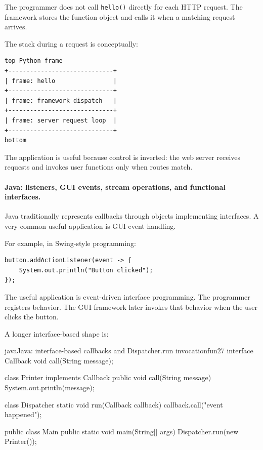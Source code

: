 \documentclass[a4paper,twoside]{report}
\begin{document}
The programmer does not call \texttt{hello()} directly for each HTTP request. The framework stores the function object and calls it when a matching request arrives.

The stack during a request is conceptually:

\begin{verbatim}
top Python frame
+-----------------------------+
| frame: hello                |
+-----------------------------+
| frame: framework dispatch   |
+-----------------------------+
| frame: server request loop  |
+-----------------------------+
bottom
\end{verbatim}

The application is useful because control is inverted: the web server receives requests and invokes user functions only when routes match.

\paragraph{Java: listeners, GUI events, stream operations, and functional interfaces.}

Java traditionally represents callbacks through objects implementing interfaces. A very common useful application is GUI event handling.

For example, in Swing-style programming:

\begin{verbatim}
button.addActionListener(event -> {
    System.out.println("Button clicked");
});
\end{verbatim}

The useful application is event-driven interface programming. The programmer registers behavior. The GUI framework later invokes that behavior when the user clicks the button.

A longer interface-based shape is:

\begin{codebox}[]{java}{Java: interface-based callbacks and Dispatcher.run invocation}{fun27}
interface Callback {
    void call(String message);
}

class Printer implements Callback {
    public void call(String message) {
        System.out.println(message);
    }
}

class Dispatcher {
    static void run(Callback callback) {
        callback.call("event happened");
    }
}

public class Main {
    public static void main(String[] args) {
        Dispatcher.run(new Printer());
    }
}
\end{codebox}
\end{document}
